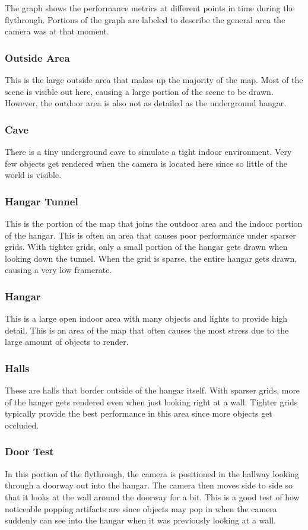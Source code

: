 \documentclass[12pt]{ucthesis}
\begin{document}
The graph shows the performance metrics at different points in time during the flythrough.
Portions of the graph are labeled to describe the general area the camera was at that moment.

\subsubsection{Outside Area}
This is the large outside area that makes up the majority of the map.
Most of the scene is visible out here, causing a large portion of the scene to be drawn.
However, the outdoor area is also not as detailed as the underground hangar.

\subsubsection{Cave}
There is a tiny underground cave to simulate a tight indoor environment.
Very few objects get rendered when the camera is located here since so little of the world is visible.

\subsubsection{Hangar Tunnel}
This is the portion of the map that joins the outdoor area and the indoor portion of the hangar.
This is often an area that causes poor performance under sparser grids.
With tighter grids, only a small portion of the hangar gets drawn when looking down the tunnel.
When the grid is sparse, the entire hangar gets drawn, causing a very low framerate.

\subsubsection{Hangar}
This is a large open indoor area with many objects and lights to provide high detail.
This is an area of the map that often causes the most stress due to the large amount of objects to render.

\subsubsection{Halls}
These are halls that border outside of the hangar itself.
With sparser grids, more of the hanger gets rendered even when just looking right at a wall.
Tighter grids typically provide the best performance in this area since more objects get occluded.

\subsubsection{Door Test}
In this portion of the flythrough, the camera is positioned in the hallway looking through a doorway out into the hangar.
The camera then moves side to side so that it looks at the wall around the doorway for a bit.
This is a good test of how noticeable popping artifacts are since objects may pop in when the camera suddenly can see into the hangar when it was previously looking at a wall.
\end{document}
